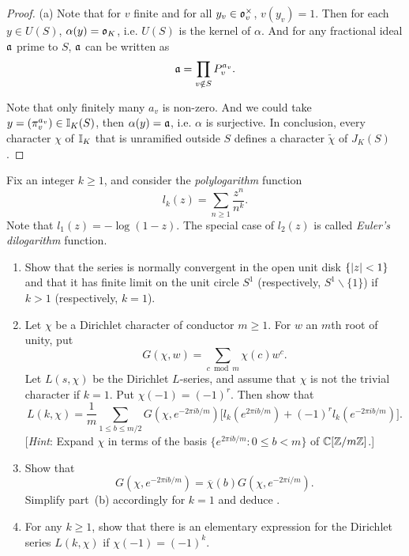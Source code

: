 \begin{proof}
  (a) Note that for $v$ finite and for all $y_v \in \mathfrak{o}_v^\times$, $v(y_v) = 1$.
  Then for each $y \in U(S)$, $\alpha(y) = \mathfrak{o}_K$, i.e. $U(S)$ is the kernel of
  $\alpha$. And for any fractional ideal $\mathfrak{a}$ prime to $S$, $\mathfrak{a}$ can be written as
  \[\mathfrak{a} = \prod_{v \notin S} P^{a_v}_v.  \]

  Note that only finitely many $a_v$ is non-zero. And we could take $y = (\pi_v^{a_v}) \in \mathbb{I}_K(S)$,
  then $\alpha(y) = \mathfrak{a}$, i.e. $\alpha$ is surjective. In conclusion,
  every character $\chi$ of $\mathbb{I}_K$ that is unramified outside $S$ defines a
  character $\widetilde{\chi}$ of $J_K(S)$.
\end{proof}

\begin{exercise}[14]
  \label{ex:ch7-14}
  Fix an integer $k \ge 1$, and consider the \emph{polylogarithm} function
  \[
    l_k(z) = \sum_{n \ge 1} \frac{z^n}{n^k}.
  \]
  Note that $l_1(z) = -\log(1-z)$. The special case of $l_2(z)$ is called
  \emph{Euler's dilogarithm} function.
  \begin{enumerate}[label=(\alph*)]
    \item Show that the series is normally convergent in the open unit disk
      $\{\lvert z\rvert < 1\}$ and that it has finite limit on the unit circle
      $S^1$ (respectively, $S^1 \smallsetminus \{1\}$) if $k > 1$
      (respectively, $k = 1$).
    \item Let $\chi$ be a Dirichlet character of conductor $m \ge 1$. For $w$
      an $m$th root of unity, put
      \[
        G(\chi, w) = \sum_{c \bmod m} \chi(c) w^c.
      \]
      Let $L(s, \chi)$ be the Dirichlet $L$-series, and assume that $\chi$ is
      not the trivial character if $k = 1$. Put $\chi(-1) = (-1)^r$. Then
      show that
      \[
        L(k, \chi) = \frac{1}{m} \sum_{1 \le b \le m/2}
        G(\chi, e^{-2\pi i b/m})
        \bigl[l_k(e^{2\pi i b/m}) + (-1)^r l_k(e^{-2\pi i b/m})\bigr].
      \]
      [\emph{Hint}: Expand $\chi$ in terms of the basis
      $\{e^{2\pi i b/m} : 0 \le b < m\}$ of $\mathbb{C}[\mathbb{Z}/m\mathbb{Z}]$.]
    \item Show that
      \[
        G(\chi, e^{-2\pi i b/m}) = \overline{\chi}(b) G(\chi, e^{-2\pi i/m}).
      \]
      Simplify part~(b) accordingly for $k = 1$ and deduce
      .
    \item For any $k \ge 1$, show that there is an elementary expression for
      the Dirichlet series $L(k, \chi)$ if $\chi(-1) = (-1)^k$.
  \end{enumerate}
\end{exercise}

